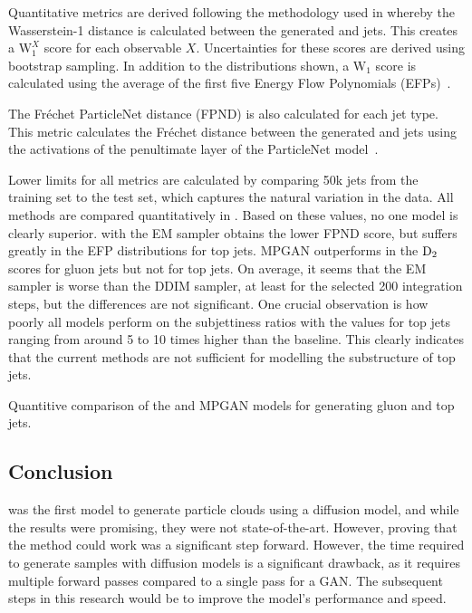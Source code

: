 Quantitative metrics are derived following the methodology used in \textcite{MPGAN} whereby the Wasserstein-1 distance is calculated between the generated and \pythia jets.
This creates a $\text{W}_1^X$ score for each observable $X$.
Uncertainties for these scores are derived using bootstrap sampling.
In addition to the distributions shown, a $\text{W}_1$ score is calculated using the average of the first five Energy Flow Polynomials (EFPs)~\cite{EFP}.

The Fréchet ParticleNet distance (FPND) is also calculated for each jet type.
This metric calculates the Fréchet distance between the generated and \pythia jets using the activations of the penultimate layer of the ParticleNet model~\cite{MPGAN, ParticleNet}.

Lower limits for all metrics are calculated by comparing 50k jets from the training set to the test set, which captures the natural variation in the data.
All methods are compared quantitatively in .
Based on these values, no one model is clearly superior.
\pcjedi with the EM sampler obtains the lower FPND score, but suffers greatly in the EFP distributions for top jets.
MPGAN outperforms \pcjedi in the $\text{D}_2$ scores for gluon jets but not for top jets.
On average, it seems that the EM sampler is worse than the DDIM sampler, at least for the selected 200 integration steps, but the differences are not significant.
One crucial observation is how poorly all models perform on the subjettiness ratios with the values for top jets ranging from around 5 to 10 times higher than the \pythia baseline.
This clearly indicates that the current methods are not sufficient for modelling the substructure of top jets.

\begin{table}[tp]
    \centering
    \caption{Quantitive comparison of the \pcjedi and MPGAN models for generating gluon and top jets.}
    \label{tab:combined_results}
    \renewcommand{\arraystretch}{1.5}
    \resizebox{\textwidth}{!}{%
        
    }
\end{table}

\subsection{Conclusion}

\pcjedi was the first model to generate particle clouds using a diffusion model, and while the results were promising, they were not state-of-the-art.
However, proving that the method could work was a significant step forward.
However, the time required to generate samples with diffusion models is a significant drawback, as it requires multiple forward passes compared to a single pass for a GAN\@.
The subsequent steps in this research would be to improve the model's performance and speed.

